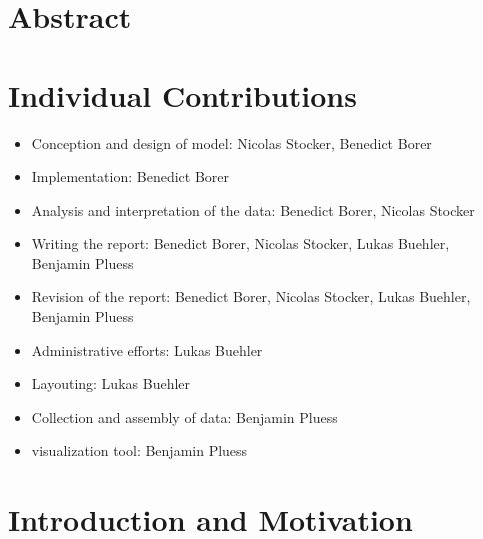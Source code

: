 \documentclass[11pt]{article}
\begin{document}






\tableofcontents

\newpage




\section{Abstract}











\section{Individual Contributions}

\begin{itemize}
\item Conception and design of model: Nicolas Stocker, Benedict Borer
\item Implementation: Benedict Borer
\item Analysis and interpretation of the data: Benedict Borer, Nicolas Stocker
\item Writing the report: Benedict Borer, Nicolas Stocker, Lukas Buehler, Benjamin Pluess
\item Revision of the report: Benedict Borer, Nicolas Stocker, Lukas Buehler, Benjamin Pluess
\item Administrative efforts: Lukas Buehler
\item Layouting: Lukas Buehler
\item Collection and assembly of data: Benjamin Pluess
\item visualization tool: Benjamin Pluess

\end{itemize}



\section{Introduction and Motivation}
\end{document}

